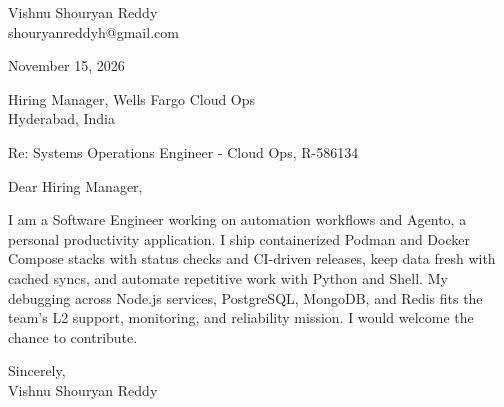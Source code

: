 \documentclass[a4paper,11pt]{article}
\begin{document}
\pagestyle{empty}
Vishnu Shouryan Reddy \\
shouryanreddyh@gmail.com

\vspace{1em}
November 15, 2026

\vspace{1em}
Hiring Manager, Wells Fargo Cloud Ops \\
Hyderabad, India

\vspace{1em}
Re: Systems Operations Engineer - Cloud Ops, R-586134

\vspace{1em}
Dear Hiring Manager,

\vspace{0.5em}
I am a Software Engineer working on automation workflows and Agento, a personal productivity application. I ship containerized Podman and Docker Compose stacks with status checks and CI-driven releases, keep data fresh with cached syncs, and automate repetitive work with Python and Shell. My debugging across Node.js services, PostgreSQL, MongoDB, and Redis fits the team's L2 support, monitoring, and reliability mission. I would welcome the chance to contribute.

\vspace{1em}
Sincerely, \\
Vishnu Shouryan Reddy
\end{document}
